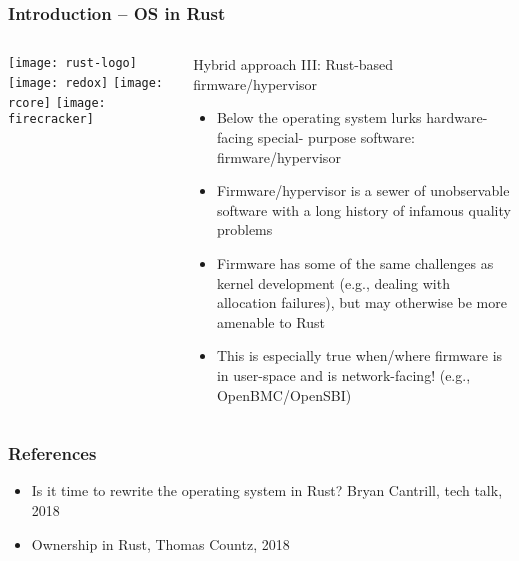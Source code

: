 \begin{frame}[plain]
	\frametitle{Introduction -- OS in Rust}
	
	
	
	\begin{columns}
		
		\begin{column}{.2\textwidth}
			
			\texttt{[image: rust-logo]}
			\texttt{[image: redox]}
			\texttt{[image: rcore]}
			\texttt{[image: firecracker]}
		\end{column}
		
		\begin{column}{.8\textwidth}
			
			Hybrid approach III: Rust-based firmware/hypervisor

			\begin{itemize}
				
				\item  Below the operating system lurks hardware-facing special-
				purpose software: firmware/hypervisor
				
				
				\item Firmware/hypervisor is a sewer of unobservable software with a long
				history of infamous quality problems
				
				
				\item  Firmware has some of the same challenges as kernel
				development (e.g., dealing with allocation failures), but may
				otherwise be more amenable to Rust

				\item This is especially true when/where firmware is in user-space
				and is network-facing! (e.g., OpenBMC/OpenSBI)
				
			\end{itemize}
			
		\end{column}
		
		
	\end{columns}
	
	
\end{frame}

\begin{frame}[plain]
	\frametitle{References}
	
	\begin{itemize}
		
		\item Is it time to rewrite the operating system in Rust? Bryan Cantrill, tech talk, 2018
		\item Ownership in Rust, Thomas Countz, 2018
		
		
		
	\end{itemize}
	
	
\end{frame}
